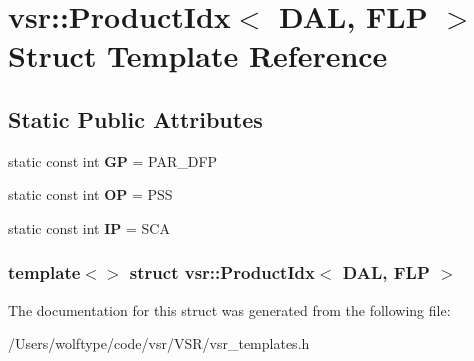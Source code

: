 \hypertarget{structvsr_1_1_product_idx_3_01_d_a_l_00_01_f_l_p_01_4}{\section{vsr\-:\-:Product\-Idx$<$ D\-A\-L, F\-L\-P $>$ Struct Template Reference}
\label{structvsr_1_1_product_idx_3_01_d_a_l_00_01_f_l_p_01_4}
}
\subsection*{Static Public Attributes}
\begin{DoxyCompactItemize}
\item 
\hypertarget{structvsr_1_1_product_idx_3_01_d_a_l_00_01_f_l_p_01_4_a05ea2ed94c0b96865f2a08176fe8038c}{static const int {\bfseries G\-P} = P\-A\-R\-\_\-\-D\-F\-P}\label{structvsr_1_1_product_idx_3_01_d_a_l_00_01_f_l_p_01_4_a05ea2ed94c0b96865f2a08176fe8038c}

\item 
\hypertarget{structvsr_1_1_product_idx_3_01_d_a_l_00_01_f_l_p_01_4_a24aae744fbcbb38e982577b4281b8d4f}{static const int {\bfseries O\-P} = P\-S\-S}\label{structvsr_1_1_product_idx_3_01_d_a_l_00_01_f_l_p_01_4_a24aae744fbcbb38e982577b4281b8d4f}

\item 
\hypertarget{structvsr_1_1_product_idx_3_01_d_a_l_00_01_f_l_p_01_4_a9f0f403dda445c609f1a4c77be68b340}{static const int {\bfseries I\-P} = S\-C\-A}\label{structvsr_1_1_product_idx_3_01_d_a_l_00_01_f_l_p_01_4_a9f0f403dda445c609f1a4c77be68b340}

\end{DoxyCompactItemize}
\subsubsection*{template$<$$>$ struct vsr\-::\-Product\-Idx$<$ D\-A\-L, F\-L\-P $>$}



The documentation for this struct was generated from the following file\-:\begin{DoxyCompactItemize}
\item 
/\-Users/wolftype/code/vsr/\-V\-S\-R/vsr\-\_\-templates.\-h\end{DoxyCompactItemize}
